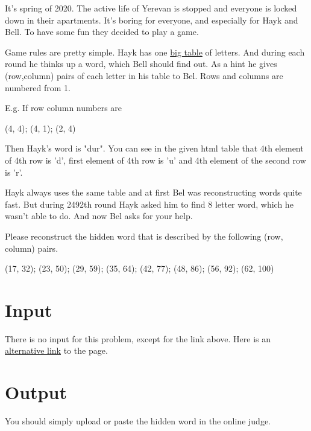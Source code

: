 It's spring of 2020.
The active life of Yerevan is stopped and everyone is locked down in their apartments.
It's boring for everyone, and especially for Hayk and Bell. 
To have some fun they decided to play a game.

Game rules are pretty simple.
Hayk has one \href{http://ejudge.rau.am/ejudge/hayktable.html}{big table} of letters. And during each round he thinks up a word, which Bell should find out. As a hint he gives (row,column) pairs of each letter in his table to Bel.
Rows and columns are numbered from 1.

E.g. If row column numbers are

(4, 4); (4, 1); (2, 4)


Then Hayk's word is "dur".
You can see in the given html table that 4th element of 4th row is 'd', first element of 4th row is 'u' and 4th element of the second row is 'r'.

Hayk always uses the same table and at first Bel was reconstructing words quite fast.
But during 2492th round Hayk asked him to find 8 letter word, which he wasn't able to do.
And now Bel asks for your help.

Please reconstruct the hidden word that is described by the following (row, column) pairs.

(17, 32); (23, 50); (29, 59); (35, 64); (42, 77); (48, 86); (56, 92); (62, 100)

\section*{Input}
There is no input for this problem, except for the link above.
Here is an \href{http://167.71.248.201/ejudge/hayktable.html}{alternative link} to the page.

\section*{Output}
You should simply upload or paste the hidden word in the online judge. 